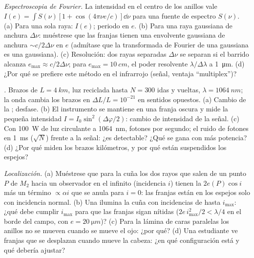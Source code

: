 \begin{exercise}[$\star\star\star$]\label{exo:b2:michelson:10}
\emph{Espectroscopia de Fourier.} La intensidad en el centro de los anillos
vale $I(e) = \int S(\nu)[1 + \cos(4\pi\nu e/c)]\dd\nu$ para una fuente de espectro
$S(\nu)$. (a) Para una sola raya: $I(e)$; periodo en $e$. (b) Para una raya
gaussiana de anchura $\Delta\nu$: muéstrese que las franjas tienen una envolvente gaussiana de
anchura $\sim c/2\Delta\nu$ en $e$ (admítase que la transformada de Fourier de una gaussiana
es una gaussiana). (c) Resolución: dos rayas separadas $\Delta\nu$ se separan si
el barrido alcanza $e_{\max} \approx c/2\Delta\nu$; para $e_{\max} = \qty{10}{cm}$, el
poder resolvente $\lambda/\Delta\lambda$ a \qty{1}{\micro m}. (d) ¿Por qué se prefiere este método
en el infrarrojo (señal, ventaja ``multiplex'')?
\end{exercise}

\begin{exercise}[$\star\star\star$]\label{exo:b2:michelson:11}
\emph{.} Brazos de $L = \qty{4}{km}$, luz reciclada
hasta $N = 300$ idas y vueltas, $\lambda = \qty{1064}{nm}$; la onda cambia los brazos en
$\Delta L/L = 10^{-21}$ en sentidos opuestos. (a) Cambio de la ;
desfase. (b) El instrumento se mantiene en una franja oscura y mide
la pequeña intensidad $I = I_0\sin^2(\Delta\varphi/2)$: cambio de intensidad de la
señal. (c) Con \qty{100}{W} de luz circulante a \qty{1064}{nm}, fotones
por segundo; el ruido de fotones en \qty{1}{ms} ($\sqrt N$) frente a la señal:
¿es detectable? ¿Qué se gana con más potencia? (d) ¿Por qué miden los brazos
kilómetros, y por qué están suspendidos los espejos?
\end{exercise}

\begin{exercise}[$\star\star\star$]\label{exo:b2:michelson:12}
\emph{Localización.} (a) Muéstrese que para la cuña los dos rayos que salen de un
punto $P$ de $M_2$ hacia un observador en el infinito (incidencia $i$) tienen la
 $2e(P)\cos i$ más un término $\propto\alpha i$ que se anula para
$i = 0$: las franjas están en los espejos solo con incidencia normal. (b)
Una  ilumina la cuña con incidencias de hasta
$i_{\max}$: ¿qué debe cumplir $i_{\max}$ para que las franjas sigan nítidas
($2e\,i_{\max}^2/2 < \lambda/4$ en el borde del campo, con $e = \qty{20}{\micro m}$)? (c)
Para la lámina de caras paralelas los anillos no se mueven cuando se mueve el ojo:
¿por qué? (d) Una estudiante ve franjas que se desplazan cuando mueve la cabeza:
¿en qué configuración está y qué debería ajustar?
\end{exercise}

